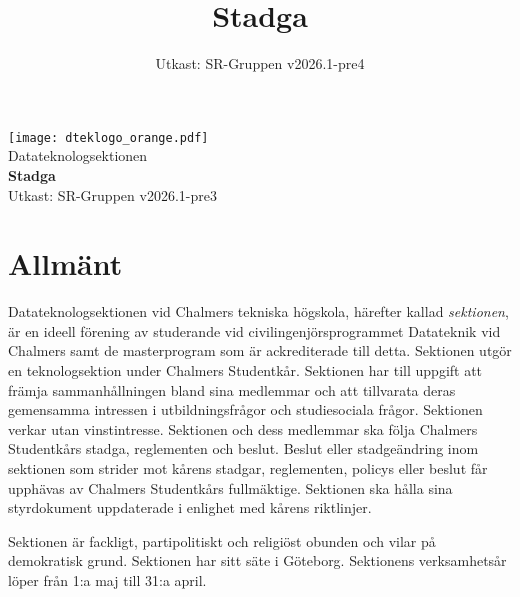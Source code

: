 \documentclass[a4paper]{dteklag}
\title{Stadga}
\date{Utkast: SR-Gruppen v2026.1-pre4}
\begin{document}
\begin{titlepage}
  \thispagestyle{empty} %
  \vspace*{1cm}
  \begin{center}
    \texttt{[image: dteklogo\_orange.pdf]}\\[3em]
    {\Huge Datateknologsektionen}\\[3em]
    {\Huge \textbf{Stadga}}\\[1em]
    Utkast: SR-Gruppen v2026.1-pre3
  \end{center}
\end{titlepage}

\makeheadfoot

\setcounter{tocdepth}{2}
\tableofcontents

\section{Allmänt}
\para[Ändamål] Datateknologsektionen vid Chalmers tekniska högskola, härefter kallad \textit{sektionen}, är en ideell förening av studerande vid civilingenjörsprogrammet Datateknik vid Chalmers samt de masterprogram som är ackrediterade till detta. Sektionen utgör en teknologsektion under Chalmers Studentkår. 
\para Sektionen har till uppgift att främja sammanhållningen bland sina medlemmar och att tillvarata deras gemensamma intressen i utbildningsfrågor och studiesociala frågor. Sektionen verkar utan vinstintresse.
\para Sektionen och dess medlemmar ska följa Chalmers Studentkårs stadga, reglementen och beslut. Beslut eller stadgeändring inom sektionen som strider mot kårens stadgar, reglementen, policys eller beslut får upphävas av Chalmers Studentkårs fullmäktige. Sektionen ska hålla sina styrdokument uppdaterade i enlighet med kårens riktlinjer. 

\para Sektionen är fackligt, partipolitiskt och religiöst obunden och vilar på demokratisk grund.
\para Sektionen har sitt säte i Göteborg.
\para Sektionens verksamhetsår löper från 1:a maj till 31:a april.


\end{document}
